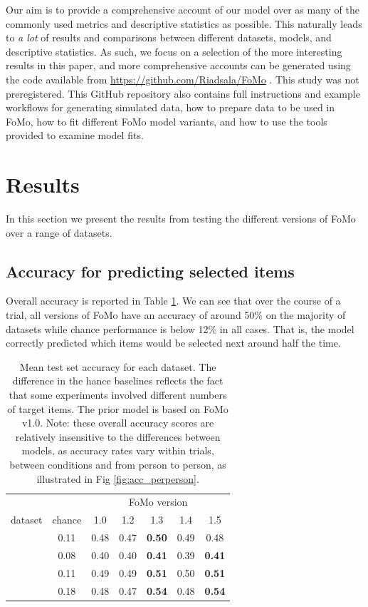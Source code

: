 \documentclass[man, floatsintext]{apa7}
\begin{document}
Our aim is to provide a comprehensive account of our model over as many of the commonly used metrics and descriptive statistics as possible. This naturally leads to \textit{a lot} of results and comparisons between different datasets, models, and descriptive statistics. As such, we focus on a selection of the more interesting results in this paper, and more comprehensive accounts can be generated using the code available from \url{https://github.com/Riadsala/FoMo} \citep{clarke2025}. This study was not preregistered. This GitHub repository also contains full instructions and example workflows for generating simulated data, how to prepare data to be used in FoMo, how to fit different FoMo model variants, and how to use the tools provided to examine model fits.

\section{Results}

In this section we present the results from testing the different versions of FoMo over a range of datasets. 

\subsection{Accuracy for predicting selected items}

Overall accuracy is reported in Table \ref{tab:overall_all}. We can see that over the course of a trial, all versions of FoMo have an accuracy of around 50\% on the majority of datasets while chance performance is below 12\% in all cases. That is, the model correctly predicted which items would be selected next around half the time.

\begin{table}
    \centering
    \begin{tabular}{r|c|c|cccc}
                &                &      \multicolumn{5}{c}{FoMo version} \\
        dataset & chance &  1.0 &   1.2 & 1.3 & 1.4 & 1.5\\
        \hline
         \cite{kristjansson2014} & 0.11  & 0.48 & 0.47 & \textbf{0.50} & 0.49  & 0.48\\
         \cite{tagu2022selection}& 0.08 & 0.40 & 0.40 & \textbf{0.41} & 0.39 & \textbf{0.41}\\
         \cite{clarke2022qjep} &  0.11  &  0.49 & 0.49 & \textbf{0.51} & 0.50  & \textbf{0.51}\\
         \cite{hughes2024}       & 0.18  &  0.48 &	0.47 & \textbf{0.54} & 0.48 & \textbf{0.54}\\
    \end{tabular}
    \caption{Mean test set accuracy for each dataset. The difference in the hance baselines reflects the fact that some experiments involved different numbers of target items. The prior model is based on FoMo v1.0. Note: these overall accuracy scores are relatively insensitive to the differences between models, as accuracy rates vary within trials, between conditions and from person to person, as illustrated in Fig \ref{fig:acc_perperson}.}
    \label{tab:overall_all}
\end{table}
\end{document}
